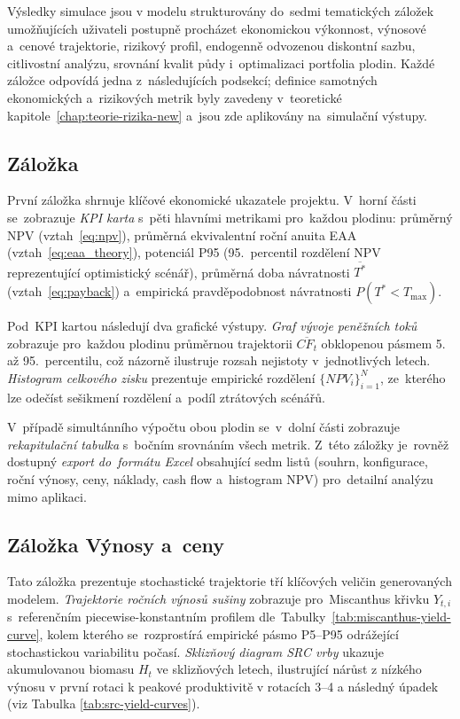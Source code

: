 Výsledky simulace jsou v modelu strukturovány
do~sedmi tematických záložek umožňujících uživateli postupně procházet
ekonomickou výkonnost, výnosové a~cenové trajektorie, rizikový profil,
endogenně odvozenou diskontní sazbu, citlivostní analýzu, srovnání
kvalit půdy i~optimalizaci portfolia plodin. Každé záložce odpovídá
jedna z~následujících podsekcí; definice samotných ekonomických
a~rizikových metrik byly zavedeny v~teoretické
kapitole~\ref{chap:teorie-rizika-new} a~jsou zde aplikovány
na~simulační výstupy.

\subsection{Záložka }
\label{sec:vystupy_prehled}

První záložka shrnuje klíčové ekonomické ukazatele projektu.
V~horní části se~zobrazuje \emph{KPI karta} s~pěti hlavními metrikami
pro~každou plodinu: průměrný NPV (vztah~\eqref{eq:npv}), průměrná
ekvivalentní roční anuita EAA (vztah~\eqref{eq:eaa_theory}),
potenciál P95 (95.~percentil rozdělení NPV reprezentující optimistický
scénář), průměrná doba návratnosti $\overline{T^*}$ (vztah~\eqref{eq:payback})
a~empirická pravděpodobnost návratnosti $P(T^* < T_{\max})$.

Pod~KPI kartou následují dva grafické výstupy. \emph{Graf vývoje
peněžních toků} zobrazuje pro~každou plodinu průměrnou trajektorii
$\overline{CF_t}$ obklopenou pásmem 5.\,až 95.~percentilu, což názorně
ilustruje rozsah nejistoty v~jednotlivých letech. \emph{Histogram
celkového zisku} prezentuje empirické rozdělení $\{NPV_i\}_{i=1}^{N}$,
ze~kterého lze odečíst sešikmení rozdělení a~podíl ztrátových scénářů.

V~případě simultánního výpočtu obou plodin se~v~dolní části zobrazuje
\emph{rekapitulační tabulka} s~bočním srovnáním všech metrik. Z~této
záložky je~rovněž dostupný \emph{export do~formátu Excel} obsahující
sedm listů (souhrn, konfigurace, roční výnosy, ceny, náklady, cash
flow a~histogram NPV) pro~detailní analýzu mimo aplikaci.

\subsection{Záložka Výnosy a~ceny}
\label{sec:vystupy_vynosy}

Tato záložka prezentuje stochastické trajektorie tří klíčových
veličin generovaných modelem. \emph{Trajektorie ročních výnosů
sušiny} zobrazuje pro~Miscanthus křivku $Y_{t,i}$ s~referenčním
piecewise-konstantním profilem dle~Tabulky~\ref{tab:miscanthus-yield-curve},
kolem kterého se~rozprostírá empirické pásmo P5--P95 odrážející
stochastickou variabilitu počasí. \emph{Sklizňový diagram SRC vrby}
ukazuje akumulovanou biomasu $H_t$ ve sklizňových letech, ilustrující
nárůst z nízkého výnosu v první rotaci k peakové produktivitě v rotacích
3–4 a následný úpadek (viz Tabulka \ref{tab:src-yield-curves}).


